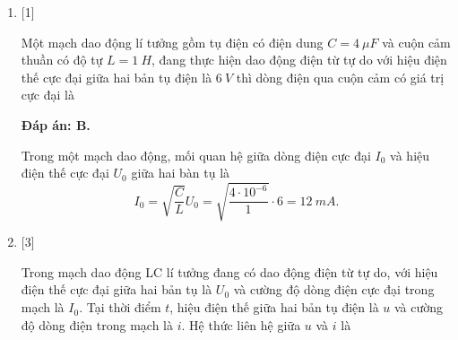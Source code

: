 \begin{enumerate}[label=\bfseries Câu \arabic*:]
{	}

	\item {} [1]
	
	\cauhoi
	{Một mạch dao động lí tưởng gồm tụ điện có điện dung $C = \SI{4}{\mu F}$ và cuộn cảm thuần có độ tự $L = \SI{1}{H}$, đang thực hiện dao động điện từ tự do với hiệu điện thế cực đại giữa hai bản tụ điện là $\SI{6}{V}$ thì dòng điện qua cuộn cảm có giá trị cực đại là
	}
	
	\loigiai
	{		\textbf{Đáp án: B.}
		
Trong một mạch dao động, mối quan hệ giữa dòng điện cực đại $I_{0}$ và hiệu điện thế cực đại $U_{0}$ giữa hai bàn tụ là
$$
I_{0}=\sqrt{\dfrac{C}{L}} U_{0}=\sqrt{\dfrac{4\cdot10^{-6}}{1}} \cdot 6=  \SI{12}{mA}.
$$

		
	}


	\item {} [3]
	
	\cauhoi
	{Trong mạch dao động LC lí tưởng đang có dao động điện từ tự do, với hiệu điện thế cực đại giữa hai bản tụ là $U_0$ và cường độ dòng điện cực đại trong mạch là $I_0$. Tại thời điểm $t$, hiệu điện thế giữa hai bản tụ điện là $u$ và cường độ dòng điện trong mạch là $i$. Hệ thức liên hệ giữa $u$ và $i$ là
	}
	

\end{enumerate}
